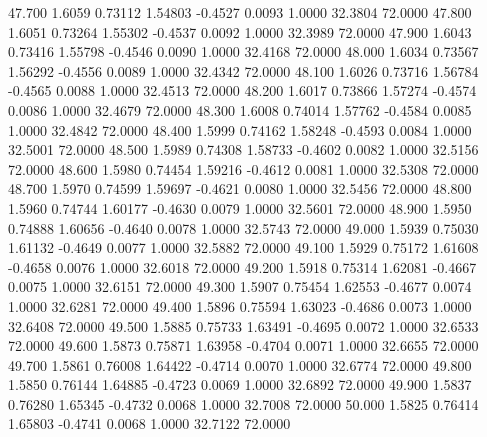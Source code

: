   47.700   1.6059   0.73112   1.54803  -0.4527   0.0093   1.0000  32.3804  72.0000
  47.800   1.6051   0.73264   1.55302  -0.4537   0.0092   1.0000  32.3989  72.0000
  47.900   1.6043   0.73416   1.55798  -0.4546   0.0090   1.0000  32.4168  72.0000
  48.000   1.6034   0.73567   1.56292  -0.4556   0.0089   1.0000  32.4342  72.0000
  48.100   1.6026   0.73716   1.56784  -0.4565   0.0088   1.0000  32.4513  72.0000
  48.200   1.6017   0.73866   1.57274  -0.4574   0.0086   1.0000  32.4679  72.0000
  48.300   1.6008   0.74014   1.57762  -0.4584   0.0085   1.0000  32.4842  72.0000
  48.400   1.5999   0.74162   1.58248  -0.4593   0.0084   1.0000  32.5001  72.0000
  48.500   1.5989   0.74308   1.58733  -0.4602   0.0082   1.0000  32.5156  72.0000
  48.600   1.5980   0.74454   1.59216  -0.4612   0.0081   1.0000  32.5308  72.0000
  48.700   1.5970   0.74599   1.59697  -0.4621   0.0080   1.0000  32.5456  72.0000
  48.800   1.5960   0.74744   1.60177  -0.4630   0.0079   1.0000  32.5601  72.0000
  48.900   1.5950   0.74888   1.60656  -0.4640   0.0078   1.0000  32.5743  72.0000
  49.000   1.5939   0.75030   1.61132  -0.4649   0.0077   1.0000  32.5882  72.0000
  49.100   1.5929   0.75172   1.61608  -0.4658   0.0076   1.0000  32.6018  72.0000
  49.200   1.5918   0.75314   1.62081  -0.4667   0.0075   1.0000  32.6151  72.0000
  49.300   1.5907   0.75454   1.62553  -0.4677   0.0074   1.0000  32.6281  72.0000
  49.400   1.5896   0.75594   1.63023  -0.4686   0.0073   1.0000  32.6408  72.0000
  49.500   1.5885   0.75733   1.63491  -0.4695   0.0072   1.0000  32.6533  72.0000
  49.600   1.5873   0.75871   1.63958  -0.4704   0.0071   1.0000  32.6655  72.0000
  49.700   1.5861   0.76008   1.64422  -0.4714   0.0070   1.0000  32.6774  72.0000
  49.800   1.5850   0.76144   1.64885  -0.4723   0.0069   1.0000  32.6892  72.0000
  49.900   1.5837   0.76280   1.65345  -0.4732   0.0068   1.0000  32.7008  72.0000
  50.000   1.5825   0.76414   1.65803  -0.4741   0.0068   1.0000  32.7122  72.0000
